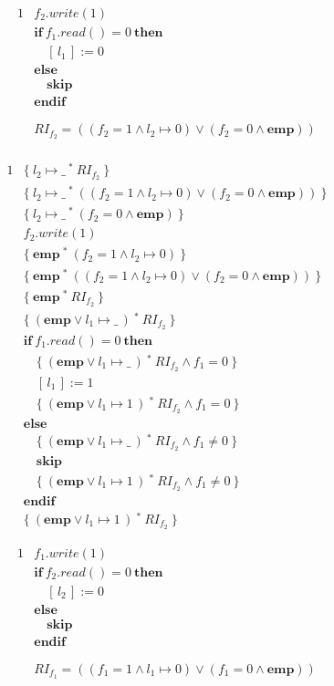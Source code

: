 \documentclass[12pt]{article}
\newcommand{\ifstmt}[3]{
  & \textbf{if}\ #1\ \textbf{then}\ \\
  #2\ \\
  & \textbf{else} \\
  #3\ \\
  & \textbf{endif} \\
}
\newcommand{\mt}[2]{
  #1 \mapsto #2
}
\newcommand{\sepcon}[2]{
  #1\ ^*\ #2
}
\newcommand{\emp}{
  \textbf{emp}
}
\newcommand{\riftwofst}{
  (f_2 = 1 \land \mt{l_2}{0})
}
\newcommand{\riftwosnd}{
  ( f_2 = 0 \land \emp)
}
\newcommand{\riftwo}{
  (\riftwofst \lor \riftwosnd)
}
\newcommand{\rifonefst}{
  (f_1 = 1 \land \mt{l_1}{0})
}
\newcommand{\rifonesnd}{
  ( f_1 = 0 \land \emp)
}
\newcommand{\rifone}{
  (\rifonefst \lor \rifonesnd)
}
\begin{document}
\begin{alignat*}{1}
  &  f_2.write(1) \\
  \ifstmt{ f_1.read() = 0}{& \quad [\,l_1\,] := 0}{& \quad \textbf{skip}} \\
  & \\
  & RI_{f_2} = \riftwo \\
\end{alignat*}

\begin{alignat*}{1}
  & \{\ \sepcon{\mt{l_2}{\_}}{RI_{f_2}}\ \} \\
  & \{\ \sepcon{\mt{l_2}{\_}}{\riftwo}\ \} \\
  & \{\ \sepcon{\mt{l_2}{\_}}{\riftwosnd}\ \} \\
  &  f_2.write( 1 ) \\
  & \{\ \sepcon{\emp}{\riftwofst} \ \} \\
  & \{\ \sepcon{\emp}{\riftwo} \ \} \\
  & \{\ \sepcon{\emp}{RI_{f_2}} \ \} \\
  & \{\ \sepcon{(\emp \lor \mt{l_1}{\_}\,)}{RI_{f_2}}\ \} \\
  \ifstmt{
    f_1.read() = 0
  }{
    & \quad \{\ \sepcon{(\emp \lor \mt{l_1}{\_}\,)}{RI_{f_2}} \land f_1 = 0\ \} \\
    & \quad [\,l_1\,] := 1 \\
    & \quad \{\
    \sepcon{
      (\emp \lor \mt{l_1}{1}\,)
    }{
      RI_{f_2}
    }
    \land f_1 = 0\ \}
  }{
    & \quad \{\
    \sepcon{
      (\emp \lor \mt{l_1}{\_}\,)
    }{
      RI_{f_2}
    }
    \land f_1 \neq 0\ \} \\
    & \quad \textbf{skip} \\
    & \quad \{\
    \sepcon{
      (\emp \lor \mt{l_1}{1}\,)
    }{
      RI_{f_2}
    }
    \land f_1 \neq 0\ \}
  }
  & \{\ \sepcon{ (\emp \lor \mt{l_1}{1}\,) }{ RI_{f_2} } \ \}
\end{alignat*}

\newpage

\begin{alignat*}{1}
  &  f_1.write(1) \\
  \ifstmt{ f_2.read() = 0}{& \quad [\,l_2\,] := 0}{& \quad \textbf{skip}} \\
  & \\
  & RI_{f_1} = \rifone \\
\end{alignat*}
\end{document}
